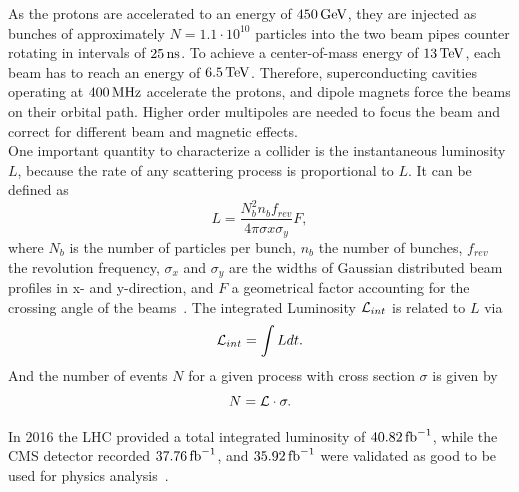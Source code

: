 As the protons are accelerated to an energy of $450\,\text{Ge\hspace{-.08em}V}$, they are injected as bunches of approximately $N=1.1\cdot10^{10}$ particles into the two beam pipes counter rotating in intervals of $25\,\text{ns}$. To achieve a center-of-mass energy of $13\,\text{Te\hspace{-.08em}V}$, each beam has to reach an energy of $6.5\,\text{Te\hspace{-.08em}V}$. Therefore, superconducting cavities operating at $400\,\text{MHz}$ accelerate the protons, and dipole magnets force the beams on their orbital path. Higher order multipoles are needed to focus the beam and correct for different beam and magnetic effects.\\
One important quantity to characterize a collider is the instantaneous luminosity $L$, because the rate of any scattering process is proportional to $L$. It can be defined as
\begin{equation}
 L = \frac{N_{b}^2 n_{b} f_{rev}} {4\pi \sigma{x} \sigma_{y}}F,
\end{equation}
where $N_b$ is the number of particles per bunch, $n_b$ the number of bunches, $f_{rev}$ the revolution frequency, $\sigma_{x}$ and $\sigma_{y}$ are the widths of Gaussian distributed beam profiles in x- and y-direction, and $F$ a geometrical factor accounting for the crossing angle of the beams~\cite{LuminosityConcept}. The integrated Luminosity $\mathcal{L}_{int}$ is related to $L$ via
\begin{equation}
 \mathcal{L}_{int}= \int L dt.
\end{equation}
And the number of events $N$ for a given process with cross section $\sigma$ is given by
\begin{equation}
 N= \mathcal{L} \cdot \sigma.
\end{equation}

In 2016 the LHC provided a total integrated luminosity of $40.82\mbox{\ensuremath{\,\text{fb}^\text{$-$1}}}$, while the CMS detector recorded $37.76\mbox{\ensuremath{\,\text{fb}^\text{$-$1}}}$, and $35.92\mbox{\ensuremath{\,\text{fb}^\text{$-$1}}}$ were validated as good to be used for physics analysis~\cite{DataQuality}.





